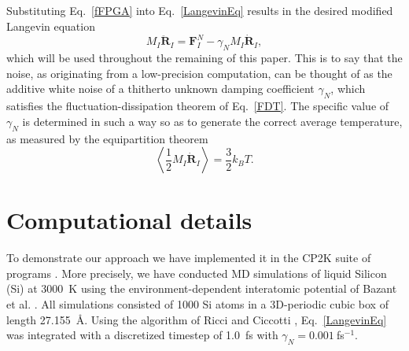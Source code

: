 \documentclass[format=acmsmall,review,timestamp,urlbreakonhyphens]{acmart}
\begin{document}
Substituting Eq.~\ref{fFPGA} into Eq.~\ref{LangevinEq} results in the desired modified Langevin equation
\begin{equation} \label{modLangevin}
M_{I}\ddot{\textbf{R}}_{I} = \textbf{F}_{I}^{N}-\gamma _{N}M_{I}\dot{\textbf{R}}_{I},
\end{equation}
which will be used throughout the remaining of this paper. This is to say that the noise, as originating from a low-precision computation, can be thought of as the additive white noise of a thitherto unknown damping coefficient $\gamma_N$, which satisfies the fluctuation-dissipation theorem of Eq.~\ref{FDT}.  The specific value of $\gamma_N$ is determined in such a way so as to generate the correct average temperature, as measured by the equipartition theorem
\begin{equation}
\left\langle \frac{1}{2} M_I \dot{\textbf{R}}_{I} \right\rangle = \frac{3}{2} k_B T.
\label{EquiPartTheorem}
\end{equation}




\section{Computational details}
\label{sec:computational}
To demonstrate our approach we have implemented it in the CP2K suite of programs \cite{cp2k}. More precisely, we have conducted MD simulations of liquid Silicon (Si) at 3000~K using the environment-dependent interatomic potential of Bazant et al. \cite{EIP1,EIP2}.
All simulations consisted of 1000 Si atoms in a 3D-periodic cubic box of length 27.155~\AA. Using the algorithm of Ricci and Ciccotti \cite{Ricci}, Eq.~\ref{LangevinEq} was integrated with a discretized timestep of 1.0~fs with $\gamma_N = 0.001~$fs$^{-1}$.
\end{document}
